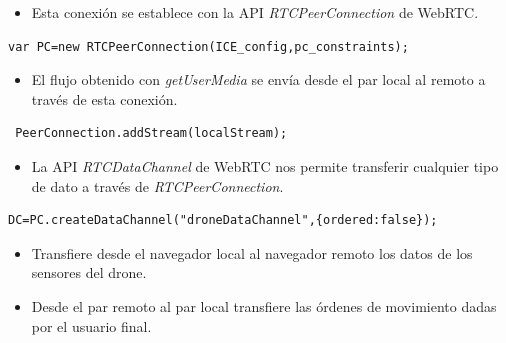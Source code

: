 \documentclass[notes,slidesec,a4]{seminar}
\begin{document}

\begin{hslide}
\begin{itemize}
\item Esta conexión se establece con la API \emph{RTCPeerConnection} de WebRTC.
\end{itemize}
\lstset{}
\begin{lstlisting}
var PC=new RTCPeerConnection(ICE_config,pc_constraints);
\end{lstlisting}

\begin{itemize}
\item El flujo obtenido con \emph{getUserMedia} se envía desde el par local al remoto a través de esta conexión.
\end{itemize}
\lstset{}
\begin{lstlisting}
 PeerConnection.addStream(localStream);
\end{lstlisting}
\end{hslide}


\begin{hslide}
\begin{itemize}
\item La API \emph{RTCDataChannel} de WebRTC nos permite transferir cualquier tipo de dato a través de \emph{RTCPeerConnection}.
\end{itemize}
\lstset{}
\begin{lstlisting}
DC=PC.createDataChannel("droneDataChannel",{ordered:false});
\end{lstlisting}

\begin{itemize}
\item Transfiere desde el navegador local al navegador remoto los datos de los sensores del drone.
\item Desde el par remoto al par local transfiere las órdenes de movimiento dadas por el usuario final.
\end{itemize}
\end{hslide}


\end{document}
